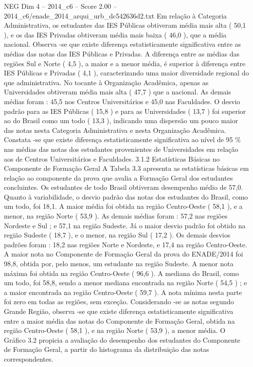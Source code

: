 \begin{textsample}{NEG Dim 4 – 2014\_c6 – Score 2.00 – 2014\_c6/enade\_2014\_arqui\_urb\_dc542636d2.txt}
Em relação à Categoria Administrativa, os estudantes das IES Públicas obtiveram média mais alta ( 50,1 ), e os das IES Privadas obtiveram média mais baixa ( 46,0 ), que a média nacional.
Observa -se que existe diferença estatisticamente significativa entre as médias das notas das IES Públicas e Privadas.
A diferença entre as médias das regiões Sul e Norte ( 4,5 ), a maior e a menor média, é superior à diferença entre IES Públicas e Privadas ( 4,1 ), caracterizando uma maior diversidade regional do que administrativa.
No tocante à Organização Acadêmica, apenas as Universidades obtiveram média mais alta ( 47,7 ) que a nacional.
As demais médias foram : 45,5 nos Centros Universitários e 45,0 nas Faculdades.
O desvio padrão para as IES Públicas ( 15,8 ) e para as Universidades ( 13,7 ) foi superior ao do Brasil como um todo ( 13,3 ), indicando uma dispersão um pouco maior das notas nesta Categoria Administrativa e nesta Organização Acadêmica.
Constata -se que existe diferença estatisticamente significativa ao nível de 95 \% nas médias das notas dos estudantes provenientes de Universidades em relação aos de Centros Universitários e Faculdades. 3.1.2 Estatísticas Básicas no Componente de Formação Geral A Tabela 3.3 apresenta as estatísticas básicas em relação ao componente da prova que avalia a Formação Geral dos estudantes concluintes.
Os estudantes de todo Brasil obtiveram desempenho médio de 57,0.
Quanto à variabilidade, o desvio padrão das notas dos estudantes do Brasil, como um todo, foi 18,1.
A maior média foi obtida na região Centro-Oeste ( 58,1 ), e a menor, na região Norte ( 53,9 ).
As demais médias foram : 57,2 nas regiões Nordeste e Sul ; e 57,1 na região Sudeste.
Já o maior desvio padrão foi obtido na região Sudeste ( 18,7 ), e o menor, na região Sul ( 17,2 ).
Os demais desvios padrões foram : 18,2 nas regiões Norte e Nordeste, e 17,4 na região Centro-Oeste.
A maior nota no Componente de Formação Geral da prova do ENADE/2014 foi 98,8, obtida por, pelo menos, um estudante na região Sudeste.
A menor nota máxima foi obtida na região Centro-Oeste ( 96,6 ).
A mediana do Brasil, como um todo, foi 58,8, sendo a menor mediana encontrada na região Norte ( 54,5 ) ; e a maior encontrada na região Centro-Oeste ( 59,7 ).
A nota mínima nesta parte foi zero em todas as regiões, sem exceção.
Considerando -se as notas segundo Grande Região, observa -se que existe diferença estatisticamente significativa entre a maior média das notas do Componente de Formação Geral, obtida na região Centro-Oeste ( 58,1 ), e na região Norte ( 53,9 ), a menor média.
O Gráfico 3.2 propicia a avaliação do desempenho dos estudantes do Componente de Formação Geral, a partir do histograma da distribuição das notas correspondentes.

\end{textsample}
